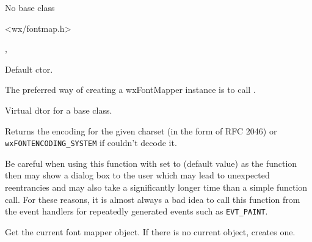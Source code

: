 
No base class


<wx/fontmap.h>


, 



\label{wxfontmapperwxfontmapper}


Default ctor.


The preferred way of creating a wxFontMapper instance is to call 
.


\label{wxfontmapperdtor}


Virtual dtor for a base class.


\label{wxfontmappercharsettoencoding}


Returns the encoding for the given charset (in the form of RFC 2046) or
\texttt{wxFONTENCODING\_SYSTEM} if couldn't decode it.

Be careful when using this function with  set to \true
(default value) as the function then may show a dialog box to the user which
may lead to unexpected reentrancies and may also take a significantly longer
time than a simple function call. For these reasons, it is almost always a bad
idea to call this function from the event handlers for repeatedly generated
events such as \texttt{EVT\_PAINT}.


\label{wxfontmapperget}


Get the current font mapper object. If there is no current object, creates
one.




